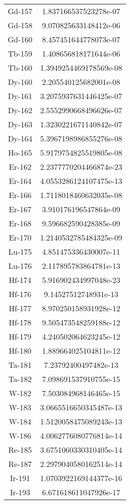 \begin{table}[h!]
\begin{tabular}{|| c || c |}
Gd-157 & 1.837166537523278e-07 \\
Gd-158 & 9.070825633148412e-06 \\
Gd-160 & 8.457451644778073e-07 \\
Tb-159 & 1.408656818171644e-06 \\
Tb-160 & 1.3949254469178569e-08 \\
Dy-160 & 2.205540125682001e-08 \\
Dy-161 & 3.2075937631446425e-07 \\
Dy-162 & 2.5552990668496626e-07 \\
Dy-163 & 1.3230221671140842e-07 \\
Dy-164 & 5.3967198986855276e-08 \\
Ho-165 & 5.9179754825519805e-08 \\
Er-162 & 2.2377770204466874e-23 \\
Er-164 & 4.0553286124107475e-13 \\
Er-166 & 1.7118018460632035e-08 \\
Er-167 & 3.910176196547864e-09 \\
Er-168 & 9.596682590428385e-09 \\
Er-170 & 1.2140532785484325e-09 \\
Lu-175 & 4.851475336430007e-11 \\
Lu-176 & 2.117895783864781e-13 \\
Hf-174 & 5.916902434997048e-23 \\
Hf-176 & 9.14527512748931e-13 \\
Hf-177 & 8.970250158931928e-12 \\
Hf-178 & 9.505473548259188e-12 \\
Hf-179 & 4.240502064623245e-12 \\
Hf-180 & 1.889664025104811e-12 \\
Ta-181 & 7.23792400497482e-13 \\
Ta-182 & 7.098691537910755e-15 \\
W-182 & 7.503084968146465e-15 \\
W-183 & 3.0665516650345487e-13 \\
W-184 & 1.5120058475089243e-13 \\
W-186 & 4.0062776080776814e-14 \\
Re-185 & 3.6751060330310405e-14 \\
Re-187 & 2.2979040580162514e-14 \\
Ir-191 & 1.0703922169144377e-16 \\
Ir-193 & 6.671618611047926e-17 \\

\end{tabular}
\end{table}
